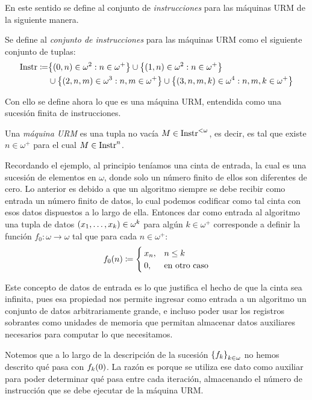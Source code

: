 En este sentido se define al conjunto de \emph{instrucciones} para las máquinas URM de la siguiente manera.

\begin{definition}[Instrucciones]
	Se define al \emph{conjunto de instrucciones} para las máquinas URM como el siguiente conjunto de tuplas:
	\begin{align*}
		\INSTRUCCIONES\coloneqq&\set*{\pa*{0, n}\in\omega^{2}: n\in\omega^{+}}\cup\set*{\pa*{1, n}\in\omega^{2}: n\in\omega^{+}}\\
		&\cup\set*{\pa*{2, n, m}\in\omega^{3}: n, m\in\omega^{+}}\cup\set*{\pa*{3, n, m, k}\in\omega^{4}: n, m, k\in\omega^{+}}
	\end{align*}
\end{definition}

Con ello se define ahora lo que es una máquina URM, entendida como una sucesión finita de instrucciones.

\begin{definition}
	Una \emph{máquina URM} es una tupla no vacía $M\in\INSTRUCCIONES^{<\omega}$, es decir, es tal que existe $n\in\omega^{+}$ para el cual $M\in\INSTRUCCIONES^{n}$.
\end{definition}

Recordando el ejemplo, al principio teníamos una cinta de entrada, la cual es una sucesión de elementos en $\omega$, donde solo un número finito de ellos son diferentes de cero. Lo anterior es debido a que un algoritmo siempre se debe recibir como entrada un número finito de datos, lo cual podemos codificar como tal cinta con esos datos dispuestos a lo largo de ella. Entonces dar como entrada al algoritmo una tupla de datos $\pa*{x_{1},\dotsc, x_{k}}\in\omega^{k}$ para algún $k\in\omega^{+}$ corresponde a definir la función $f_{0}:\omega\to\omega$ tal que para cada $n\in\omega^{+}$:
\[
	f_{0}\pa*{n}\coloneqq
	\begin{cases}
		x_{n}, & n\leq k\\
		0, &\text{en otro caso}
	\end{cases}
\]

Este concepto de datos de entrada es lo que justifica el hecho de que la cinta sea infinita, pues esa propiedad nos permite ingresar como entrada a un algoritmo un conjunto de datos arbitrariamente grande, e incluso poder usar los registros sobrantes como unidades de memoria que permitan almacenar datos auxiliares necesarios para computar lo que necesitamos.

Notemos que a lo largo de la descripción de la sucesión $\set*{f_{k}}_{k\in\omega}$ no hemos descrito qué pasa con $f_{k}\pa*{0}$. La razón es porque se utiliza ese dato como auxiliar para poder determinar qué pasa entre cada iteración, almacenando el número de instrucción que se debe ejecutar de la máquina URM.

